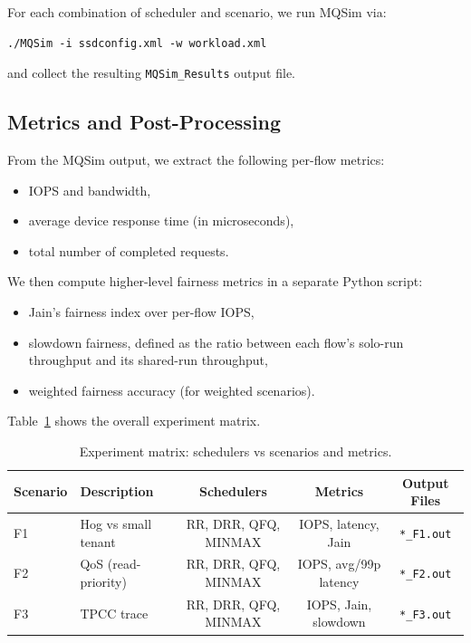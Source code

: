 \documentclass[11pt]{article}
\begin{document}
For each combination of scheduler and scenario, we run MQSim via:
\begin{verbatim}
./MQSim -i ssdconfig.xml -w workload.xml
\end{verbatim}
and collect the resulting \texttt{MQSim\_Results} output file.

\subsection{Metrics and Post-Processing}

From the MQSim output, we extract the following per-flow metrics:
\begin{itemize}
    \item IOPS and bandwidth,
    \item average device response time (in microseconds),
    \item total number of completed requests.
\end{itemize}

We then compute higher-level fairness metrics in a separate Python script:
\begin{itemize}
    \item Jain's fairness index over per-flow IOPS,
    \item slowdown fairness, defined as the ratio between each flow's solo-run throughput and its shared-run throughput,
    \item weighted fairness accuracy (for weighted scenarios).
\end{itemize}

Table~\ref{tab:exp-matrix} shows the overall experiment matrix.

\begin{table}[h]
    \centering
    \caption{Experiment matrix: schedulers vs scenarios and metrics.}
    \label{tab:exp-matrix}
    \begin{tabular}{llccc}
        \toprule
        Scenario & Description & Schedulers & Metrics & Output Files \\
        \midrule
        F1 & Hog vs small tenant &
        RR, DRR, QFQ, MINMAX &
        IOPS, latency, Jain &
        \texttt{*{\_}F1.out} \\
        F2 & QoS (read-priority) &
        RR, DRR, QFQ, MINMAX &
        IOPS, avg/99p latency &
        \texttt{*{\_}F2.out} \\
        F3 & TPCC trace &
        RR, DRR, QFQ, MINMAX &
        IOPS, Jain, slowdown &
        \texttt{*{\_}F3.out} \\
        \bottomrule
    \end{tabular}
\end{table}
\end{document}
